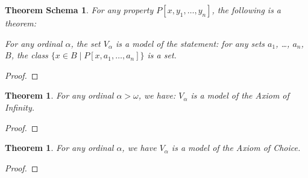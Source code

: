\documentclass{book}
\let\qed\relax
\newtheorem{thm}[ax]{Theorem}
\newtheorem{thms}[ax]{Theorem Schema}
\theoremstyle{definition}
\begin{document}
\begin{thms}
\label{thm:modelComprehension}
For any property $P[x,y_1, \ldots, y_n]$, the following is a theorem:

For any ordinal $\alpha$, the set $V_\alpha$ is a model of the statement: for any sets $a_1$, \ldots, $a_n$, $B$, the class $\{ x \in B \mid P[x,a_1, \ldots, a_n] \}$ is a set.
\end{thms}

\begin{proof}
\pf
{}
\qed
\end{proof}

\begin{thm}
\label{thm:modelInfinity}
For any ordinal $\alpha > \omega$, we have: $V_\alpha$ is a model of the Axiom of Infinity.
\end{thm}

\begin{proof}
\pf
{}
\qed
\end{proof}

\begin{thm}
\label{thm:modelChoice}
For any ordinal $\alpha$, we have $V_\alpha$ is a model of the Axiom of Choice.
\end{thm}

\begin{proof}
\pf
{}
\qed
\end{proof}
\end{document}
